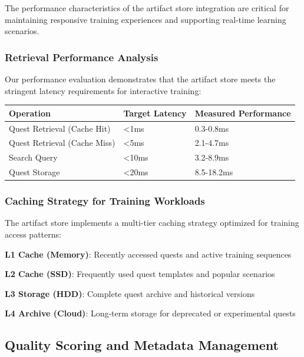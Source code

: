 The performance characteristics of the artifact store integration are critical for maintaining responsive training experiences and supporting real-time learning scenarios.

\subsubsection*{Retrieval Performance Analysis}

Our performance evaluation demonstrates that the artifact store meets the stringent latency requirements for interactive training:

\begin{center}
\begin{tabular}{@{}lll@{}}
\toprule
\textbf{Operation} & \textbf{Target Latency} & \textbf{Measured Performance} \\
\midrule
Quest Retrieval (Cache Hit) & <1ms & 0.3-0.8ms \\
Quest Retrieval (Cache Miss) & <5ms & 2.1-4.7ms \\
Search Query & <10ms & 3.2-8.9ms \\
Quest Storage & <20ms & 8.5-18.2ms \\
\bottomrule
\end{tabular}
\end{center}

\subsubsection*{Caching Strategy for Training Workloads}

The artifact store implements a multi-tier caching strategy optimized for training access patterns:

\begin{compactlist}
    \item \textbf{L1 Cache (Memory)}: Recently accessed quests and active training sequences
    \item \textbf{L2 Cache (SSD)}: Frequently used quest templates and popular scenarios
    \item \textbf{L3 Storage (HDD)}: Complete quest archive and historical versions
    \item \textbf{L4 Archive (Cloud)}: Long-term storage for deprecated or experimental quests
\end{compactlist}

\subsection*{Quality Scoring and Metadata Management}

